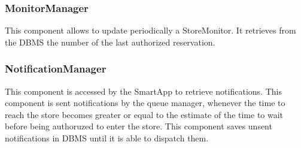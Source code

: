 \subsubsection{MonitorManager}
This component allows to update periodically a StoreMonitor. It retrieves from the DBMS the number of the last authorized reservation.
\subsubsection{NotificationManager}
This component is accessed by the SmartApp to retrieve notifications. This component is sent notifications by the queue manager, whenever the time to reach the store becomes greater or equal to the estimate of the time to wait before being authoruzed to enter the store. This component saves unsent notifications in DBMS until it is able to dispatch them.